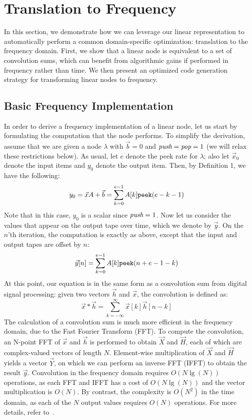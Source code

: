 \section{Translation to Frequency}
\label{sec:freq}

In this section, we demonstrate how we can leverage our linear
representation to automatically perform a common domain-specific
optimization: translation to the frequency domain.  First, we show
that a linear node is equivalent to a set of convolution sums, which
can benefit from algorithmic gains if performed in frequency rather
than time.  We then present an optimized code generation strategy for
transforming linear nodes to frequency.

\subsection{Basic Frequency Implementation}

In order to derive a frequency implementation of a linear node, let us
start by formulating the computation that the node performs.  To
simplify the derivation, assume that we are given a node $\lambda$
with ${\vec b = 0}$ and $\mbox{\it push}=\mbox{\it pop}=1$ (we will relax these
restrictions below).  As usual, let $e$ denote the peek rate for
$\lambda$; also let ${\vec x}_0$ denote the input items and $y_0$
denote the output item.  Then, by Definition 1, we have the following:
\[
y_0 = {\vec x} A + {\vec b} = \sum_{k=0}^{e-1} A[k] \mbox{\tt peek}(e-k-1)
\]
Note that in this case, $y_0$ is a scalar since $\mbox{\it push}=1$.  Now
let us consider the values that appear on the output tape over time,
which we denote by ${\vec y}$.  On the $n$'th iteration, the
computation is exactly as above, except that the input and output
tapes are offset by $n$:
\[
\label{fig:linconv}
{\vec y}[n] = \sum_{k=0}^{e-1} A[k] \mbox{\tt peek}(n+e-1-k) 
\]
At this point, our equation is in the same form as a convolution sum
from digital signal processing: given two vectors ${\vec h}$ and
${\vec x}$, the convolution is defined as:
\[
{\vec x} * {\vec h} = \sum_{k=-\infty}^{\infty} {\vec x}[k] {\vec h}[n-k]
\]
The calculation of a convolution sum is much more efficient in the
frequency domain, due to the Fast Fourier Transform (FFT).  To compute
the convolution, an N-point FFT of ${\vec x}$ and ${\vec h}$ is
performed to obtain ${\vec X}$ and ${\vec H}$, each of which are
complex-valued vectors of length $N$.  Element-wise multiplication of
${\vec X}$ and ${\vec H}$ yields a vector ${\vec Y}$, on which we can
perform an inverse FFT (IFFT) to obtain the result ${\vec y}$.
Convolution in the frequency domain requires $O(N \lg(N))$ operations,
as each FFT and IFFT has a cost of $O(N \lg (N))$ and the vector
multiplication is $O(N)$.  By contrast, the complexity is $O(N^2)$ in
the time domain, as each of the $N$ output values requires $O(N)$
operations.  For more details, refer to~\cite{oppenheim-discrete}.

